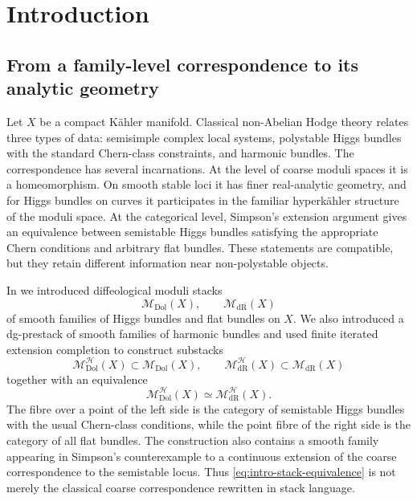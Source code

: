 \documentclass[11pt,reqno]{amsart}
\theoremstyle{definition}
\theoremstyle{remark}
\newcommand{\cH}{\mathcal H}
\newcommand{\Dol}{\mathrm{Dol}}
\newcommand{\dR}{\mathrm{dR}}
\newcommand{\MdiffDol}{\mathscr M_{\Dol}}
\newcommand{\MdiffdR}{\mathscr M_{\dR}}
\newcommand{\MHDol}{\mathscr M^{\cH}_{\Dol}}
\newcommand{\MHdR}{\mathscr M^{\cH}_{\dR}}
\begin{document}
\maketitle
\tableofcontents

\section{Introduction}
\subsection{From a family-level correspondence to its analytic geometry}

Let $X$ be a compact K\"ahler manifold.  Classical non-Abelian Hodge theory relates three types of data: semisimple complex local systems, polystable Higgs bundles with the standard Chern-class constraints, and harmonic bundles.  The correspondence has several incarnations.  At the level of coarse moduli spaces it is a homeomorphism.  On smooth stable loci it has finer real-analytic geometry, and for Higgs bundles on curves it participates in the familiar hyperk\"ahler structure of the moduli space.  At the categorical level, Simpson's extension argument gives an equivalence between semistable Higgs bundles satisfying the appropriate Chern conditions and arbitrary flat bundles.  These statements are compatible, but they retain different information near non-polystable objects.

In \cite{AzamRayan2026} we introduced diffeological moduli stacks
\[
  \MdiffDol(X),\qquad \MdiffdR(X)
\]
of smooth families of Higgs bundles and flat bundles on $X$.  We also introduced a dg-prestack of smooth families of harmonic bundles and used finite iterated extension completion to construct substacks
\[
  \MHDol(X)\subset \MdiffDol(X),
  \qquad
  \MHdR(X)\subset \MdiffdR(X)
\]
together with an equivalence
\begin{equation}\label{eq:intro-stack-equivalence}
  \MHDol(X)\simeq \MHdR(X).
\end{equation}
The fibre over a point of the left side is the category of semistable Higgs bundles with the usual Chern-class conditions, while the point fibre of the right side is the category of all flat bundles.  The construction also contains a smooth family appearing in Simpson's counterexample to a continuous extension of the coarse correspondence to the semistable locus.  Thus \eqref{eq:intro-stack-equivalence} is not merely the classical coarse correspondence rewritten in stack language.
\end{document}
